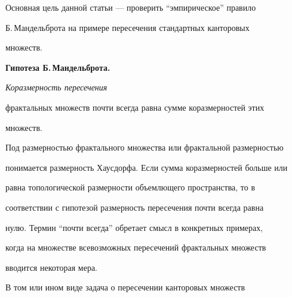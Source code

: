  


\date{} 




\pagestyle{plain} %


 




\maketitle 


\label{begin} 


 


 


Основная цель данной статьи --- проверить ``эмпирическое'' правило 


Б.\,Мандельброта \cite{1} на примере пересечения стандартных канторовых 


множеств. 


\medskip 


 


{\bf Гипотеза Б.\,Мандельброта.} {\it Коразмерность пересечения 


фрактальных множеств почти всегда равна сумме коразмерностей этих 


множеств. 


} 


\medskip 


 


Под размерностью фрактального множества или фрактальной размерностью 


понимается размерность Хаусдорфа. Если сумма коразмерностей больше или 


равна топологической размерности объемлющего пространства, то в 


соответствии с гипотезой размерность пересечения почти всегда равна 


нулю. Термин ``почти всегда'' обретает смысл в конкретных примерах, 


когда на множестве всевозможных пересечений фрактальных множеств 


вводится некоторая мера. 


 


В том или ином виде задача о пересечении канторовых множеств 


